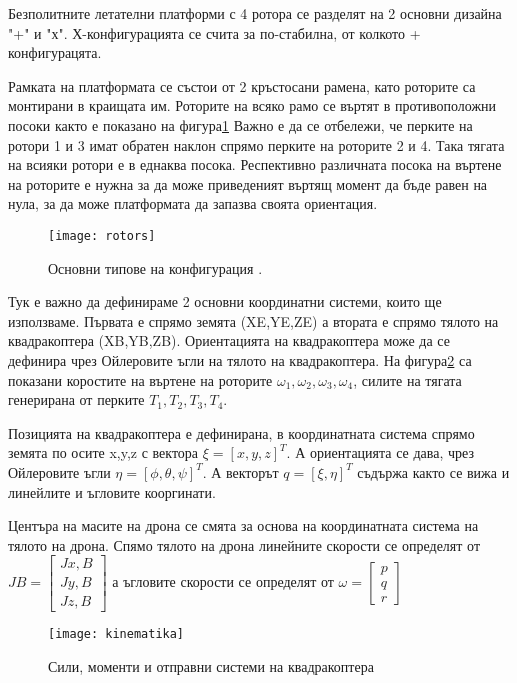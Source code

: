 \FloatBarrier
Безполитните летателни платформи с 4 ротора се разделят на 2 основни дизайна "+" и "х". 
Х-конфигурацията се счита за по-стабилна, от колкото + конфигурацята.

Рамката на платформата се състои от 2 кръстосани рамена, като роторите са монтирани в краищата им.
Роторите на всяко рамо се въртят в противоположни посоки както е показано на фигура\ref{fig:rotors}
Важно е да се отбележи, че перките на ротори 1 и 3 имат обратен наклон  спрямо перките на роторите 2 и 4.
Така тягата на всияки ротори е в еднаква посока. Респективно различната посока на въртене на роторите е нужна
за да може приведеният въртящ момент да бъде равен на нула, за да може платформата да запазва своята ориентация.

\begin{figure}[!h]
	\centering
	\texttt{[image: rotors]}
	\caption{Основни типове на конфигурация .}
	\label{fig:rotors}
\end{figure}


Тук е важно да дефинираме 2 основни координатни системи, които ще използваме. 
Първата е спрямо земята (XE,YE,ZE)  а втората е спрямо тялото на квадракоптера (XB,YB,ZB).
Ориентацията на квадракоптера може да се дефинира чрез Ойлеровите ъгли на тялото на квадракоптера.
На фигура\ref{fig:kinematika} са показани коростите на въртене на роторите \( \omega_1 , \omega_2 ,
\omega_3 , \omega_4 \), силите на тягата генерирана от перките \(T_1,T_2,T_3,T_4\).

Позицията на квадракоптера е дефинирана, в координатната система спрямо земята по осите x,y,z с вектора 
\(\xi = [x,y,z]^T\). А ориентацията се дава, чрез Ойлеровите ъгли \(\eta = [\phi,\theta,\psi]^T\).
А векторът \(q = [\xi,\eta]^T\) съдържа както се вижа и линейлите и ъгловите кооргинати.

Центъра на масите на дрона се смята за основа на координатната система на тялото на дрона. Спямо тялото на дрона
линейните скорости се определят от \(JB = \begin{bmatrix}Jx,B\\Jy,B\\Jz,B\end{bmatrix}\) а ъгловите скорости се
определят от \(\omega = \begin{bmatrix}p\\q\\r \end{bmatrix}\)

\begin{figure}[!h]
    \centering
    \texttt{[image: kinematika]}
    \caption{Сили, моменти и отправни системи на квадракоптера}
    \label{fig:kinematika}
\end{figure}

